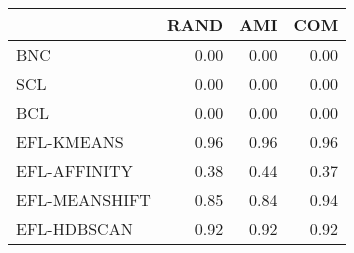 \begin{tabular}{lrrr}
\toprule
 & RAND & AMI & COM \\
\midrule
BNC & 0.00 & 0.00 & 0.00 \\
SCL & 0.00 & 0.00 & 0.00 \\
BCL & 0.00 & 0.00 & 0.00 \\
EFL-KMEANS & 0.96 & 0.96 & 0.96 \\
EFL-AFFINITY & 0.38 & 0.44 & 0.37 \\
EFL-MEANSHIFT & 0.85 & 0.84 & 0.94 \\
EFL-HDBSCAN & 0.92 & 0.92 & 0.92 \\
\bottomrule
\end{tabular}
